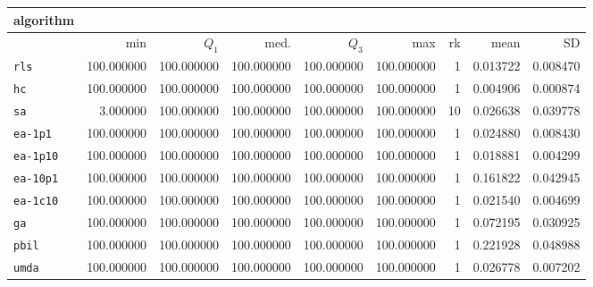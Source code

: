 \begin{center}
\begin{tabular}{@{}l*{5}{>{{}}N{3}{0}}>{{}}N{2}{0}N{1}{3}N{1}{3}@{}}
\toprule
{algorithm} &  &  \\
\midrule
& {min} & {$Q_1$} & {med.} & {$Q_3$} & {max} & {rk} & {mean} & {SD} \\
\midrule
\verb|rls| & {\color{blue}} 100.000000 & {\color{blue}} 100.000000 & {\color{blue}} 100.000000 & {\color{blue}} 100.000000 & {\color{blue}} 100.000000 & 1 & 0.013722 & 0.008470 \\
 \verb|hc| & {\color{blue}} 100.000000 & {\color{blue}} 100.000000 & {\color{blue}} 100.000000 & {\color{blue}} 100.000000 & {\color{blue}} 100.000000 & 1 & 0.004906 & 0.000874 \\
 \verb|sa| & 3.000000 & {\color{blue}} 100.000000 & {\color{blue}} 100.000000 & {\color{blue}} 100.000000 & {\color{blue}} 100.000000 & 10 & 0.026638 & 0.039778 \\
 \verb|ea-1p1| & {\color{blue}} 100.000000 & {\color{blue}} 100.000000 & {\color{blue}} 100.000000 & {\color{blue}} 100.000000 & {\color{blue}} 100.000000 & 1 & 0.024880 & 0.008430 \\
 \verb|ea-1p10| & {\color{blue}} 100.000000 & {\color{blue}} 100.000000 & {\color{blue}} 100.000000 & {\color{blue}} 100.000000 & {\color{blue}} 100.000000 & 1 & 0.018881 & 0.004299 \\
 \verb|ea-10p1| & {\color{blue}} 100.000000 & {\color{blue}} 100.000000 & {\color{blue}} 100.000000 & {\color{blue}} 100.000000 & {\color{blue}} 100.000000 & 1 & 0.161822 & 0.042945 \\
 \verb|ea-1c10| & {\color{blue}} 100.000000 & {\color{blue}} 100.000000 & {\color{blue}} 100.000000 & {\color{blue}} 100.000000 & {\color{blue}} 100.000000 & 1 & 0.021540 & 0.004699 \\
 \verb|ga| & {\color{blue}} 100.000000 & {\color{blue}} 100.000000 & {\color{blue}} 100.000000 & {\color{blue}} 100.000000 & {\color{blue}} 100.000000 & 1 & 0.072195 & 0.030925 \\
 \verb|pbil| & {\color{blue}} 100.000000 & {\color{blue}} 100.000000 & {\color{blue}} 100.000000 & {\color{blue}} 100.000000 & {\color{blue}} 100.000000 & 1 & 0.221928 & 0.048988 \\
 \verb|umda| & {\color{blue}} 100.000000 & {\color{blue}} 100.000000 & {\color{blue}} 100.000000 & {\color{blue}} 100.000000 & {\color{blue}} 100.000000 & 1 & 0.026778 & 0.007202 \\
 \bottomrule
\end{tabular}
\end{center}

